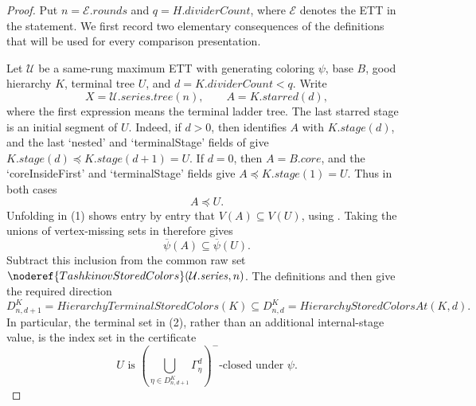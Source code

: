\begin{proof}
Put $n=\mathcal E.\mathit{rounds}$ and $q=H.\mathit{dividerCount}$,
where $\mathcal E$ denotes the ETT in the statement.  We first record two
elementary consequences of the definitions that will be used for every
comparison presentation.

Let $\mathcal U$ be a same-rung maximum ETT with generating coloring
$\psi$, base $B$, good hierarchy $K$, terminal tree $U$, and
$d=K.\mathit{dividerCount}<q$.  Write
\[
 X=\mathcal U.\mathit{series.tree}(n),\qquad
 A=K.\mathit{starred}(d),
\]
where the first expression means the terminal ladder tree.  The last
starred stage is an initial segment of $U$.  Indeed, if $d>0$, then
 identifies $A$ with $K.\mathit{stage}(d)$,
and the last `nested' and `terminalStage' fields of
 give
$K.\mathit{stage}(d)\preccurlyeq K.\mathit{stage}(d+1)=U$.  If $d=0$,
then $A=B.\mathit{core}$, and the `coreInsideFirst' and `terminalStage'
fields give $A\preccurlyeq K.\mathit{stage}(1)=U$.  Thus in both cases
\[
                       A\preccurlyeq U.                       \tag{1}
\]
Unfolding  in (1) shows entry by
entry that $V(A)\subseteq V(U)$, using
.  Taking the unions of vertex-missing
sets in  therefore gives
\[
                 \overline\psi(A)\subseteq\overline\psi(U).
\]
Subtract this inclusion from the common raw set
$\noderef{TashkinovStoredColors}(\mathcal U.\mathit{series},n)$.
The definitions  and
 then give the required direction
\[
 D^K_{n,d+1}=\mathit{HierarchyTerminalStoredColors}(K)
       \subseteq D^K_{n,d}
       =\mathit{HierarchyStoredColorsAt}(K,d).                 \tag{2}
\]
In particular, the terminal set in (2), rather than an additional
internal-stage value, is the index set in the certificate
\[
 U\text{ is }
 \left(\bigcup_{\eta\in D^K_{n,d+1}}\Gamma^d_\eta\right)^-
 \text{-closed under }\psi.                                  \tag{C}
\]


\end{proof}
